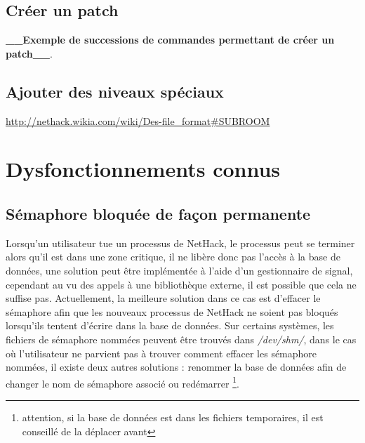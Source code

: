 \documentclass[10pt,a4paper]{report}
\begin{document}
\section{Créer un patch} \label{sec:creer-patch}

\textbf{\_\_Exemple de successions de commandes permettant de créer un patch\_\_}.

\section{Ajouter des niveaux spéciaux}

\url{http://nethack.wikia.com/wiki/Des-file\_format#SUBROOM}

\chapter{Dysfonctionnements connus}
\section{Sémaphore bloquée de façon permanente}
Lorsqu'un utilisateur tue un processus de NetHack, le processus peut se terminer
alors qu'il est dans une zone critique, il ne libère donc pas l'accès à la base
de données, une solution peut être implémentée à l'aide d'un gestionnaire de
signal, cependant au vu des appels à une bibliothèque externe, il est possible
que cela ne suffise pas. Actuellement, la meilleure solution dans ce cas est
d'effacer le sémaphore afin que les nouveaux processus de NetHack ne soient pas
bloqués lorsqu'ils tentent d'écrire dans la base de données. Sur certains
systèmes, les fichiers de sémaphore nommées peuvent être trouvés dans 
\emph{/dev/shm/}, dans le cas où l'utilisateur ne parvient pas à trouver
comment effacer les sémaphore nommées, il existe deux autres solutions :
renommer la base de données afin de changer le nom de sémaphore associé ou
redémarrer \footnote{attention, si la base de données est dans les fichiers
temporaires, il est 
conseillé de la déplacer avant}.
\end{document}
